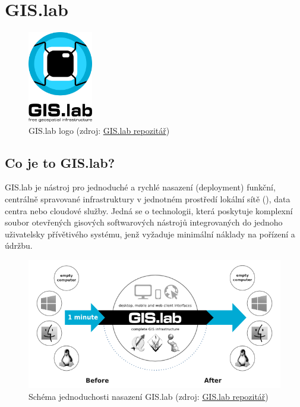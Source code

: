 \chapter{GIS.lab}
\label{2-teorie}

\begin{figure}[H] \centering
    \includegraphics[width=80pt]{./pictures/gislab-logo.png}
    \caption[GIS.lab logo]{GIS.lab logo (zdroj:
	\href{https://github.com/gislab-npo/gislab-doc/blob/master/img/logo.svg}{GIS.lab repozitář})}
	\label{fig:gislab-logo}
\end{figure}

\section{Co je to GIS.lab?}

GIS.lab je nástroj pro jednoduché a rychlé nasazení (deployment) funkční, centrálně spravované  infrastruktury v jednotném prostředí lokální sítě (), data centra nebo cloudové služby. Jedná se o technologii, která poskytuje komplexní soubor otevřených gisových softwarových nástrojů integrovaných do jednoho uživatelsky přívětivého systému, jenž vyžaduje minimální náklady na pořízení a údržbu.

\begin{figure}[H] \centering
    \includegraphics[width=400pt]{./pictures/gislab-schema.png}
    \caption[Schéma jednoduchosti nasazení GIS.lab]{Schéma jednoduchosti nasazení GIS.lab (zdroj:
	\href{https://github.com/gislab-npo/gislab-doc/blob/master/img/general/gislab-schema.png}{GIS.lab repozitář})}
	\label{fig:gislab-schema}
\end{figure}

